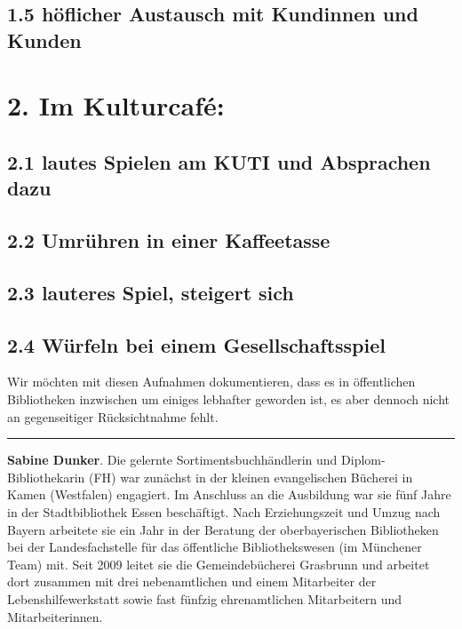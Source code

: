 \documentclass[a4paper,
fontsize=11pt,
oneside,
numbers=noperiodatend,
parskip=half-,
bibliography=totoc,
final
]{scrartcl}
\begin{document}
\hypertarget{huxf6flicher-austausch-mit-kundinnen-und-kunden}{%
\subsection{1.5 höflicher Austausch mit Kundinnen und
Kunden}\label{huxf6flicher-austausch-mit-kundinnen-und-kunden}}

\hypertarget{im-kulturcafuxe9}{%
\section{2. Im Kulturcafé:}\label{im-kulturcafuxe9}}

\hypertarget{lautes-spielen-am-kuti-und-absprachen-dazu}{%
\subsection{2.1 lautes Spielen am KUTI und Absprachen
dazu}\label{lautes-spielen-am-kuti-und-absprachen-dazu}}

\hypertarget{umruxfchren-in-einer-kaffeetasse}{%
\subsection{2.2 Umrühren in einer
Kaffeetasse}\label{umruxfchren-in-einer-kaffeetasse}}

\hypertarget{lauteres-spiel-steigert-sich}{%
\subsection{2.3 lauteres Spiel, steigert
sich}\label{lauteres-spiel-steigert-sich}}

\hypertarget{wuxfcrfeln-bei-einem-gesellschaftsspiel}{%
\subsection{2.4 Würfeln bei einem
Gesellschaftsspiel}\label{wuxfcrfeln-bei-einem-gesellschaftsspiel}}

Wir möchten mit diesen Aufnahmen dokumentieren, dass es in öffentlichen
Bibliotheken inzwischen um einiges lebhafter geworden ist, es aber
dennoch nicht an gegenseitiger Rücksichtnahme fehlt.

\begin{center}\rule{0.5\linewidth}{0.5pt}\end{center}

\textbf{Sabine Dunker}. Die gelernte Sortimentsbuchhändlerin und
Diplom-Bibliothekarin (FH) war zunächst in der kleinen evangelischen
Bücherei in Kamen (Westfalen) engagiert. Im Anschluss an die Ausbildung
war sie fünf Jahre in der Stadtbibliothek Essen beschäftigt. Nach
Erziehungszeit und Umzug nach Bayern arbeitete sie ein Jahr in der
Beratung der oberbayerischen Bibliotheken bei der Landesfachstelle für
das öffentliche Bibliothekswesen (im Münchener Team) mit. Seit 2009
leitet sie die Gemeindebücherei Grasbrunn und arbeitet dort zusammen mit
drei nebenamtlichen und einem Mitarbeiter der Lebenshilfewerkstatt sowie
fast fünfzig ehrenamtlichen Mitarbeitern und Mitarbeiterinnen.
\end{document}
